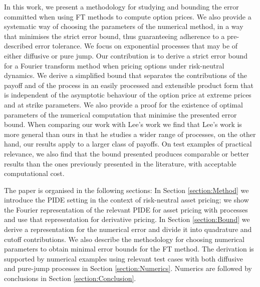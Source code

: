 \documentclass[11pt]{amsart}
\begin{document}
In this work, we present a methodology for studying
and bounding  the error committed
when using FT methods to compute option prices.
We also provide a systematic way of choosing 
the parameters of the numerical method, in a way that minimises
the strict error bound, thus guaranteeing adherence to a pre-described
error tolerance. 
We focus on exponential \levy processes that may be of either
diffusive or pure jump. Our contribution is to derive a strict error bound for a Fourier
transform method when pricing options under risk-neutral 
\levy dynamics. We derive a simplified bound that separates the contributions of
the payoff and of the process in an easily processed and extensible
product form that is independent of the asymptotic behaviour of the
option price at extreme prices and at strike parameters.
We also provide a proof for the existence of optimal
parameters of the numerical computation that minimise the presented
error bound.
When comparing our work with Lee's work we find that Lee's work is more general than ours in that he studies a wider range
of processes, on the other hand, our results apply to a larger class of payoffs.
On test examples of practical relevance, we also find that the bound presented produces comparable or better results than the ones previously presented in the literature, with acceptable computational cost.

The paper is organised in the following sections:
In Section \ref{section:Method}
we introduce the PIDE setting in the context of
risk-neutral asset pricing; we show the Fourier representation of the relevant
PIDE for asset pricing with \levy processes and use that
representation for derivative pricing.
In Section \ref{section:Bound}
we derive a representation
for the numerical error and divide it into
quadrature and cutoff contributions. We also describe the
methodology for choosing numerical
parameters to obtain minimal error bounds
for the FT method.
The derivation is supported by numerical examples
using relevant test cases with both diffusive and
pure-jump \levy processes in Section \ref{section:Numerics}.
Numerics are followed by conclusions in Section \ref{section:Conclusion}.
\end{document}
